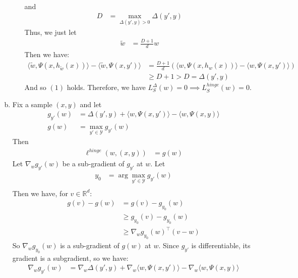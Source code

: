 \documentclass{amsart}
\newcommand{\rr}{\mathbb R}    %
\theoremstyle{definition}
\begin{document}
\begin{enumerate}[(a)]
\begin{enumerate}[(i)]
\begin{align*}
        \end{align*}
        and 
        \begin{align*}
          D &= \max_{\Delta(y', y) > 0} \Delta(y', y)
        \end{align*}
        Thus, we just let 
        \begin{align*}
          \tilde{w} &= \frac{D + 1}{d} w
        \end{align*} 
        Then we have:
        \begin{align*}
          \langle \tilde{w}, \Psi(x, h_{\tilde{w}}(x)) \rangle - \langle \tilde{w}, \Psi(x, y') \rangle &= \frac{D + 1}{d} \left(\langle w, \Psi(x, h_w(x)) \rangle - \langle w, \Psi(x, y') \rangle\right)\\
          &\ge D + 1 > D = \Delta(y', y)
        \end{align*}
        And so $(1)$ holds. Therefore, we have $L_S^{\Delta}(w) = 0 \implies L_S^{hinge}(w) = 0$.
    \end{enumerate}
    \item
      Fix a sample $(x,y)$ and let
      \begin{align*}
        g_{y'}(w) &= \Delta(y', y) + \langle w, \Psi(x, y') \rangle - \langle w, \Psi(x, y) \rangle\\
        g(w) &= \max_{y' \in \mathcal{Y}} g_{y'}(w)
      \end{align*}
      Then
      \begin{align*}
        \ell^{hinge}(w, (x,y)) &= g(w)
      \end{align*}
      Let $\nabla_w g_{y'}(w)$ be a sub-gradient of $g_{y'}$ at $w$. Let
      \begin{align*}
        y_0 &= \arg\max_{y' \in \mathcal{Y}} g_{y'}(w)\\
      \end{align*}
      Then we have, for $v \in \rr^d$:
      \begin{align*}
        g(v) - g(w) &= g(v) - g_{y_0}(w)\\
        & \ge g_{y_0}(v) - g_{y_0}(w)\\
        & \ge \nabla_w g_{y_0}(w)^\top (v - w)
      \end{align*}
      So $\nabla_w g_{y_0}(w)$ is a sub-gradient of $g(w)$ at $w$.
      Since $g_{y'}$ is differentiable, its gradient is a subgradient, so we have:
      \begin{align*}
        \nabla_w g_{y'}(w) &= \nabla_w \Delta(y', y) + \nabla_w \langle w, \Psi(x, y') \rangle - \nabla_w \langle w, \Psi(x, y) \rangle\\

\end{align*}
\end{enumerate}
\end{document}

